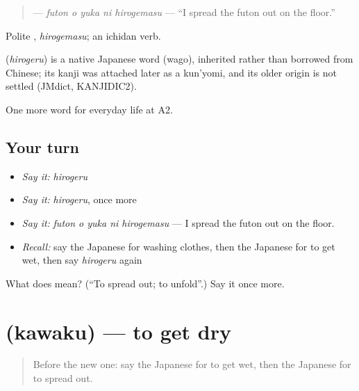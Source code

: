 \begin{quote}
\textbf{  } — \emph{futon o yuka ni hirogemasu} — \textquotedblleft{}I spread the futon out on the floor.\textquotedblright{}
\end{quote}

Polite \textbf{}, \emph{hirogemasu}; an ichidan verb.

\begin{cousinweb}
\textbf{} (\emph{hirogeru}) is a native Japanese word (wago), inherited rather than borrowed from Chinese; its kanji was attached later as a kun'yomi, and its older origin is not settled (JMdict, KANJIDIC2).
\end{cousinweb}

\begin{grammarlens}[title={What you've built}]
One more word for everyday life at A2.
\end{grammarlens}

\subsection*{Your turn}
\begin{itemize}
\raggedright
  \item \emph{Say it:} \emph{hirogeru}
  \item \emph{Say it:} \emph{hirogeru}, once more
  \item \emph{Say it:} \emph{futon o yuka ni hirogemasu} — I spread the futon out on the floor.
  \item \emph{Recall:} say the Japanese for washing clothes, then the Japanese for to get wet, then say \emph{hirogeru} again
\end{itemize}

\begin{tcolorbox}[breakable,colback=teal!4,colframe=teal!35!black,title={Before you move on}]
What does  mean? (\textquotedblleft{}To spread out; to unfold\textquotedblright{}.) Say it once more.
\end{tcolorbox}
\section[\texorpdfstring{\ja{かわく} (kawaku)}{かわく (kawaku)}]{ (kawaku) — to get dry}

\label{lesson:JA-C161-kawaku}



\begin{quote}
Before the new one: say the Japanese for to get wet, then the Japanese for to spread out.
\end{quote}

